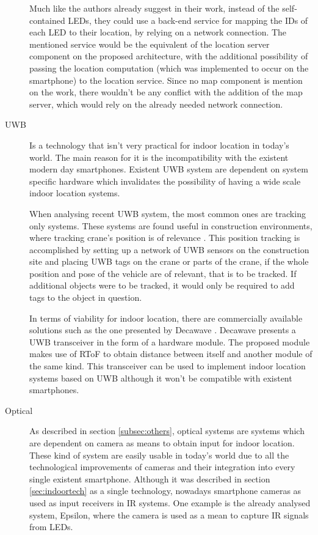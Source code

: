 \begin{description}
	Much like the authors already suggest in their work, instead of the self-contained LEDs, they could use a back-end service for mapping the IDs of each LED to their location, by relying on a network connection. The mentioned service would be the equivalent of the location server component on the proposed architecture, with the additional possibility of passing the location computation (which was implemented to occur on the smartphone) to the location service. Since no map component is mention on the work, there wouldn't be any conflict with the addition of the map server, which would rely on the already needed network connection.

\item[\acf{UWB}]  Is a technology that isn't very practical for indoor location in today's world. The main reason for it is the incompatibility with the existent modern day smartphones.
	Existent \ac{UWB} system are dependent on system specific hardware which invalidates the possibility of having a wide scale indoor location systems.

	When analysing recent \ac{UWB} system, the most common ones are tracking only systems. These systems are found useful in construction environments, where tracking crane's position is of relevance \cite{uwb-ex1}. This position tracking is accomplished by setting up a network of \ac{UWB} sensors on the construction site and placing \ac{UWB} tags on the crane or parts of the crane, if the whole position and pose of the vehicle are of relevant, that is to be tracked. If additional objects were to be tracked, it would only be required to add tags to the object in question.

	In terms of viability for indoor location, there are commercially available solutions such as the one presented by Decawave \cite{uwb-ex2}. Decawave presents a \ac{UWB} transceiver in the form of a hardware module. The proposed module makes use of \acf{RToF} to obtain distance between itself and another module of the same kind. This transceiver can be used to implement indoor location systems based on \ac{UWB} although it won't be compatible with existent smartphones.

\item [Optical] As described in section \ref{subsec:others}, optical systems are systems which are dependent on camera as means to obtain input for indoor location. These kind of system are easily usable in today's world due to all the technological improvements of cameras and their integration into every single existent smartphone. Although it was described in section \ref{sec:indoortech} as a single technology, nowadays smartphone cameras as used as input receivers in \ac{IR} systems. One example is the already analysed system, Epsilon, where the camera is used as a mean to capture \ac{IR} signals from LEDs. 


\end{description}

